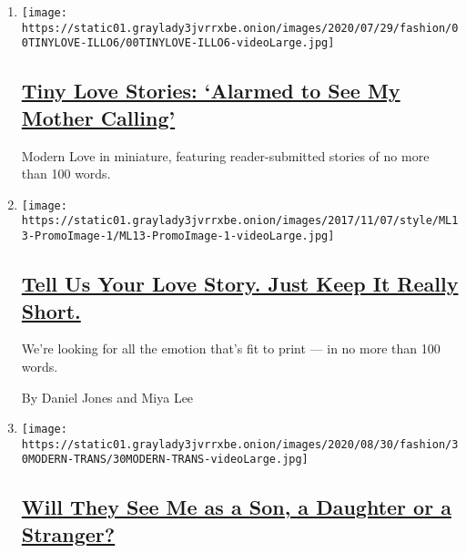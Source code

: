 \begin{enumerate}
\def\labelenumi{\arabic{enumi}.}
\item
  \texttt{[image: https://static01.graylady3jvrrxbe.onion/images/2020/07/29/fashion/00TINYLOVE-ILLO6/00TINYLOVE-ILLO6-videoLarge.jpg]}

  \hypertarget{tiny-love-stories-alarmed-to-see-my-mother-calling}{%
  \subsection{\texorpdfstring{\href{/2020/09/01/style/tiny-modern-love-stories-alarmed-to-see-my-mother-calling.html}{Tiny
  Love Stories: `Alarmed to See My Mother
  Calling'}}{Tiny Love Stories: `Alarmed to See My Mother Calling'}}\label{tiny-love-stories-alarmed-to-see-my-mother-calling}}

  Modern Love in miniature, featuring reader-submitted stories of no
  more than 100 words.
\item
  \texttt{[image: https://static01.graylady3jvrrxbe.onion/images/2017/11/07/style/ML13-PromoImage-1/ML13-PromoImage-1-videoLarge.jpg]}

  \hypertarget{tell-us-your-love-story-just-keep-it-really-short}{%
  \subsection{\texorpdfstring{\href{/2018/09/19/style/modern-love-tiny-love-stories.html}{Tell
  Us Your Love Story. Just Keep It Really
  Short.}}{Tell Us Your Love Story. Just Keep It Really Short.}}\label{tell-us-your-love-story-just-keep-it-really-short}}

  We're looking for all the emotion that's fit to print --- in no more
  than 100 words.

  By Daniel Jones and Miya Lee
\item
  \texttt{[image: https://static01.graylady3jvrrxbe.onion/images/2020/08/30/fashion/30MODERN-TRANS/30MODERN-TRANS-videoLarge.jpg]}

  \hypertarget{will-they-see-me-as-a-son-a-daughter-or-a-stranger}{%
  \subsection{\texorpdfstring{\href{/2020/08/28/style/modern-love-transgender-alzheimers-son-daughter-stranger.html}{Will
  They See Me as a Son, a Daughter or a
  Stranger?}}{Will They See Me as a Son, a Daughter or a Stranger?}}\label{will-they-see-me-as-a-son-a-daughter-or-a-stranger}}


\end{enumerate}
